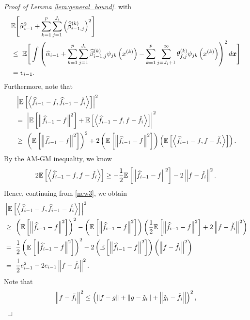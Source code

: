 \begin{proof}[Proof of Lemma \ref{lem:general_bound}]
with
\begin{align}
     &\mathbb{E}\Bigg[\widehat\alpha_{i-1}^2+ \sum_{k=1}^p\sum_{j=1}^{J_i} \Big(\widehat\beta_{i-1,j}^{(k)}\Big)^2\Bigg] \notag\\ 
    &\leq~ \mathbb{E}\Bigg[ \int \left(\widehat\alpha_{i-1}+\sum_{k=1}^p\sum_{j=1}^{J_i}\widehat\beta_{i-1,j}^{(k)}\psi_{jk}\left(x^{(k)}\right) - \sum_{k=1}^p\sum_{j = J_i+1}^\infty \theta_{f,j}^{(k)}\psi_{jk}\left(x^{(k)}\right)\right)^2 d\boldsymbol{x}\Bigg] \notag\\
    &= v_{i-1}. \label{ineq:v}
\end{align}
Furthermore, note that 
\begin{align}
    &\left|\mathbb{E}\left[\left\langle \widehat{f}_{i-1}-f,\widehat{f}_{i-1}-\check f_i \right\rangle\right]\right|^2\notag\\ 
    &=~ \left|\mathbb{E}\left[\left\|\widehat{f}_{i-1}-f\right\|^2\right] + \mathbb{E}\left[\left\langle \widehat{f}_{i-1}-f,f-\check f_i \right\rangle\right]\right|^2  \notag\\
    &\geq~ \left(\mathbb{E}\left[\left\|\widehat{f}_{i-1}-f\right\|^2\right]\right)^2 + 2\left(\mathbb{E}\left[\left\|\widehat{f}_{i-1}-f\right\|^2\right]\right) \left(\mathbb{E}\left[\left\langle \widehat{f}_{i-1}-f,f-\check f_i \right\rangle\right]\right). \label{new3}
\end{align}
By the AM-GM inequality, we know 
\begin{align*}
    2\mathbb{E}\left[\left\langle \widehat{f}_{i-1}-f,f- \check f_i \right\rangle\right] \geq -\frac{1}{2}\mathbb{E}\left[\left\|\widehat{f}_{i-1}-f\right\|^2\right] - 2\left\|f-\check f_i\right\|^2.
\end{align*}
Hence, continuing from \eqref{new3}, we obtain
\begin{align}
    &\left|\mathbb{E}\left[\left\langle \widehat{f}_{i-1}-f,\widehat{f}_{i-1}-\check f_i \right\rangle\right]\right|^2\notag\\
    &\geq~  \left(\mathbb{E}\left[\left\|\widehat{f}_{i-1}-f\right\|^2\right]\right)^2 - \left(\mathbb{E}\left[\left\|\widehat{f}_{i-1}-f\right\|^2\right]\right) \left(\frac{1}{2}\mathbb{E}\left[\left\|\widehat{f}_{i-1}-f\right\|^2\right] + 2\left\|f-\check f_i\right\|^2\right) \notag\\
    &=~ \frac{1}{2}\left(\mathbb{E}\left[\left\|\widehat{f}_{i-1}-f\right\|^2\right]\right)^2 - 2\left(\mathbb{E}\left[\left\|\widehat{f}_{i-1}-f\right\|^2\right]\right) \left(\left\|f-\check f_i\right\|^2\right)\\
    &=~ \frac{1}{2}e_{i-1}^2 - 2e_{i-1} \left\|f-\check f_i\right\|^2.
    \label{ineq:inter4}
\end{align}
Note that
\begin{align}
    \left\|f - \check f_i\right\|^2\leq  \left( \left\|f - g\right\| + \left\|g - \check g_i\right\| + \left\|\check g_i - \check f_i\right\| \right)^2, \label{ineq:f-fi}
\end{align}

\end{proof}

